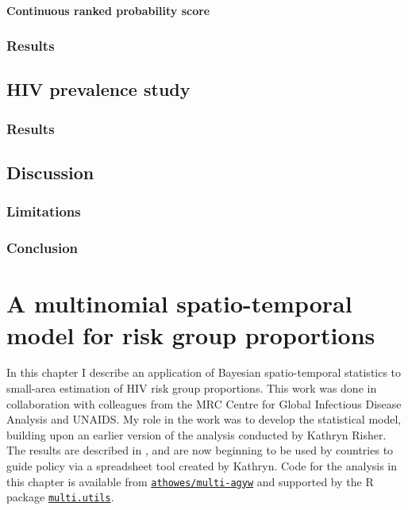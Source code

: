 \documentclass[a4paper, nobind]{templates/ociamthesis}
\begin{document}
\hypertarget{continuous-ranked-probability-score}{%
\subsubsection{Continuous ranked probability score}\label{continuous-ranked-probability-score}}

\hypertarget{results}{%
\subsection{Results}\label{results}}

\hypertarget{hiv-prevalence-study}{%
\section{HIV prevalence study}\label{hiv-prevalence-study}}

\hypertarget{results-1}{%
\subsection{Results}\label{results-1}}

\hypertarget{discussion}{%
\section{Discussion}\label{discussion}}

\hypertarget{limitations}{%
\subsection{Limitations}\label{limitations}}

\hypertarget{conclusion}{%
\subsection{Conclusion}\label{conclusion}}

\hypertarget{multi-agyw}{%
\chapter{A multinomial spatio-temporal model for risk group proportions}\label{multi-agyw}}

\adjustmtc
{}

In this chapter I describe an application of Bayesian spatio-temporal statistics to small-area estimation of HIV risk group proportions.
This work was done in collaboration with colleagues from the MRC Centre for Global Infectious Disease Analysis and UNAIDS.
My role in the work was to develop the statistical model, building upon an earlier version of the analysis conducted by Kathryn Risher.
The results are described in \textcite{howes2023spatio}, and are now beginning to be used by countries to guide policy via a spreadsheet tool created by Kathryn.
Code for the analysis in this chapter is available from \href{https://github.com/athowes/multi-agyw}{\texttt{athowes/multi-agyw}} and supported by the R package \href{https://athowes.github.io/multi.utils}{\texttt{multi.utils}}.
\end{document}

